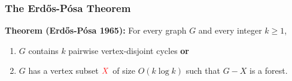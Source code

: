 \documentclass{beamer}
\begin{document}
\begin{frame}
  \frametitle{The Erdős-Pósa Theorem}

    \noindent\textbf{Theorem (Erdős-Pósa 1965):}
    For every graph $G$ and every integer $k\ge 1$,
    \begin{enumerate}%
      \item $G$ contains $k$ pairwise vertex-disjoint cycles \textbf{or}
      \item $G$ has a vertex subset $\mathcolor{red}{X}$ of size $O(k\log k)$ such that $G-X$ is a forest. 
    \end{enumerate}
    \begin{center}

\end{center}
\end{frame}
\end{document}

